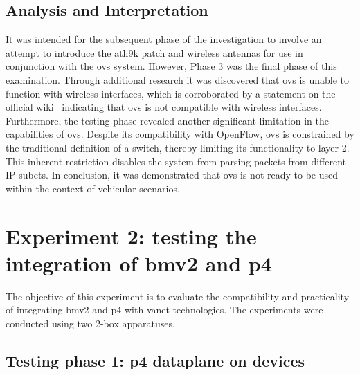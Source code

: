 \subsection{Analysis and Interpretation}
It was intended for the subsequent phase of the investigation to involve an attempt to introduce the ath9k patch and wireless antennas for use in conjunction with the \gls{ovs} system. However, Phase 3 was the final phase of this examination. Through additional research it was discovered that \gls{ovs} is unable to function with wireless interfaces, which is corroborated by a statement on the official wiki~\cite{noauthor_common_nodate} indicating that \gls{ovs} is not compatible with wireless interfaces.
Furthermore, the testing phase revealed another significant limitation in the capabilities of \gls{ovs}. Despite its compatibility with OpenFlow, \gls{ovs} is constrained by the traditional definition of a switch, thereby limiting its functionality to layer 2. This inherent restriction disables the system from parsing packets from different IP subets.
In conclusion, it was demonstrated that \gls{ovs} is not ready to be used within the context of vehicular scenarios. 

\section[Experiment 2: testing the integration of BMv2 and P4]{Experiment 2: testing the integration of \gls{bmv2} and \gls{p4}}
The objective of this experiment is to evaluate the compatibility and practicality of integrating \gls{bmv2} and \gls{p4} with \gls{vanet} technologies. The experiments were conducted using two 2-box apparatuses.

\subsection[Testing phase 1: P4 dataplane on devices]{Testing phase 1: \gls{p4} dataplane on devices}

